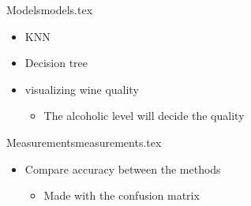 \documentclass{beamer}
\begin{document}
  \begin{notedFrame}{Models}{models.tex}
    \begin{itemize}
      \item KNN
      \item Decision tree
      \item visualizing wine quality
      \begin{itemize}
        \item The alcoholic level will decide the quality
      \end{itemize}
    \end{itemize}
  \end{notedFrame}

  \begin{notedFrame}{Measurements}{measurements.tex}
    \begin{itemize}
      \item Compare accuracy between the methods
      \begin{itemize}
        \item Made with the confusion matrix
      \end{itemize}
    \end{itemize}
  \end{notedFrame}
\end{document}
